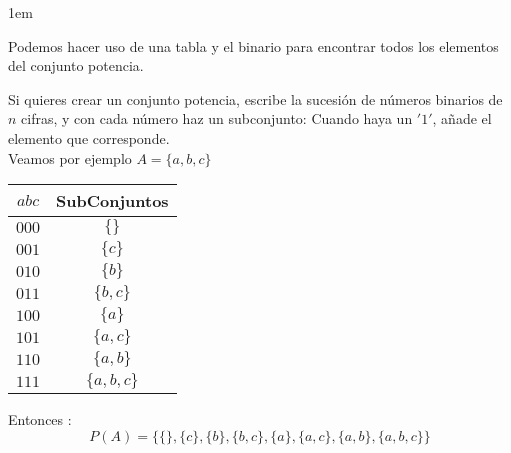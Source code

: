 \documentclass[12pt, fleqn]{report}                             %
\newenvironment{SmallIndentation}[1][0.75em]                    %
    {\begin{adjustwidth}{#1}{}\begin{footnotesize}}                 %
    {\end{footnotesize}\end{adjustwidth}}                           %
\begin{document}
                \begin{SmallIndentation}[1em]
                    
                    Podemos hacer uso de una tabla y el binario para encontrar todos los
                    elementos del conjunto potencia.

                    Si quieres crear un conjunto potencia, escribe la sucesión de números binarios de $n$ cifras,
                    y con cada número haz un subconjunto: Cuando haya un $'1'$, añade el elemento que corresponde.\\

                    Veamos por ejemplo $A = \{a, b, c\}$ \\


                    \begin{tabular}{c | c  }
                       $a b c$ & SubConjuntos       \\
                       \midrule
                      
                       $0 0 0$ &  $\{ \}$           \\
                       $0 0 1$ &  $\{ c \}$         \\
                       $0 1 0$ &  $\{ b \}$         \\
                       $0 1 1$ &  $\{ b, c \}$      \\
                       $1 0 0$ &  $\{ a \}$         \\
                       $1 0 1$ &  $\{ a, c \}$      \\
                       $1 1 0$ &  $\{ a, b \}$      \\
                       $1 1 1$ &  $\{ a, b, c \}$   \\
                     
                    \end{tabular}

                    Entonces : 
                    \begin{equation*}
                        P(A) = 
                        \{
                            \{ \}, \{ c \}, \{ b \}, \{ b, c \}, 
                            \{ a \}, \{ a, c \}, \{ a, b \}, \{ a, b, c \}
                        \}
                    \end{equation*}
                
                \end{SmallIndentation}
                
\end{document}
